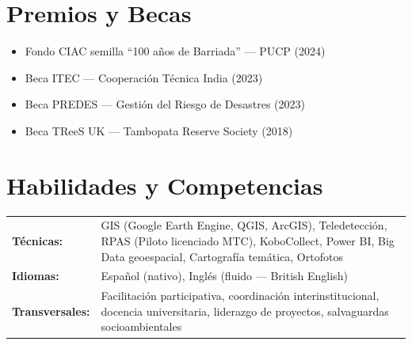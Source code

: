 \documentclass[11pt,letterpaper]{article}
\begin{document}
\section{Premios y Becas}

\begin{itemize}
  \item Fondo CIAC semilla ``100 a\~nos de Barriada'' --- PUCP (2024)
  \item Beca ITEC --- Cooperaci\'on T\'ecnica India (2023)
  \item Beca PREDES --- Gesti\'on del Riesgo de Desastres (2023)
  \item Beca TReeS UK --- Tambopata Reserve Society (2018)
\end{itemize}
\vspace{0.3em}

\section{Habilidades y Competencias}

\begin{tabularx}{\textwidth}{@{}l X@{}}
\textbf{T\'ecnicas:} & GIS (Google Earth Engine, QGIS, ArcGIS), Teledetecci\'on, RPAS (Piloto licenciado MTC), KoboCollect, Power BI, Big Data geoespacial, Cartograf\'ia tem\'atica, Ortofotos \\
\textbf{Idiomas:} & Espa\~nol (nativo), Ingl\'es (fluido --- British English) \\
\textbf{Transversales:} & Facilitaci\'on participativa, coordinaci\'on interinstitucional, docencia universitaria, liderazgo de proyectos, salvaguardas socioambientales \\
\end{tabularx}
\end{document}
